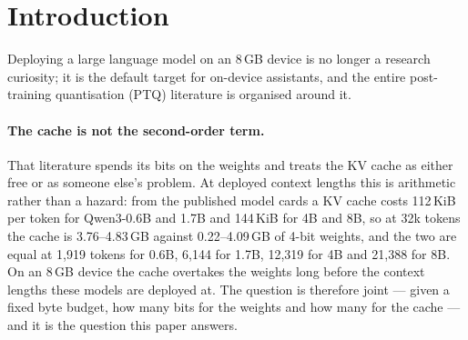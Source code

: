 %

\section{Introduction}
\label{sec:intro}

Deploying a large language model on an 8\,GB device is no longer a research
curiosity; it is the default target for on-device assistants, and the entire
post-training quantisation (PTQ) literature is organised around it.

\paragraph*{The cache is not the second-order term.}
That literature spends its bits on the weights and treats the KV cache as either
free or as someone else's problem. At deployed context lengths this is
arithmetic rather than a hazard: from the published model cards a KV cache costs
112\,KiB per token for Qwen3-0.6B and 1.7B and 144\,KiB for 4B and 8B, so at 32k
tokens the cache is 3.76--4.83\,GB against 0.22--4.09\,GB of 4-bit weights, and
the two are equal at 1{,}919 tokens for 0.6B, 6{,}144 for 1.7B, 12{,}319 for 4B
and 21{,}388 for 8B. On an 8\,GB device the cache overtakes the weights long
before the context lengths these models are deployed at. The question is
therefore joint --- given a fixed byte budget, how many bits for the weights and
how many for the cache --- and it is the question this paper answers.

